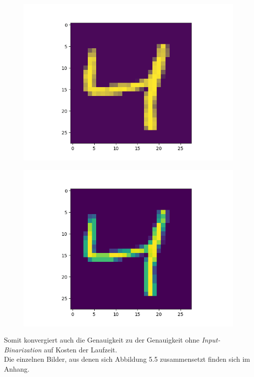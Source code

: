 \begin{figure}[h]
\centering
\begin{minipage}{.5\textwidth}
  \centering
  \includegraphics[width=.4\linewidth]{./bilder/comparison/overlapped}
  \label{fig:bin3}
\end{minipage}%
\begin{minipage}{.5\textwidth}
  \centering
  \includegraphics[width=.4\linewidth]{./bilder/comparison/default}
  \label{fig:dflt}
\end{minipage}
\end{figure}

Somit konvergiert auch die Genauigkeit zu der Genauigkeit ohne \textit{Input-Binarization} auf Kosten der Laufzeit.\\Die einzelnen Bilder, aus denen sich Abbildung 5.5 zusammensetzt finden sich im Anhang.


